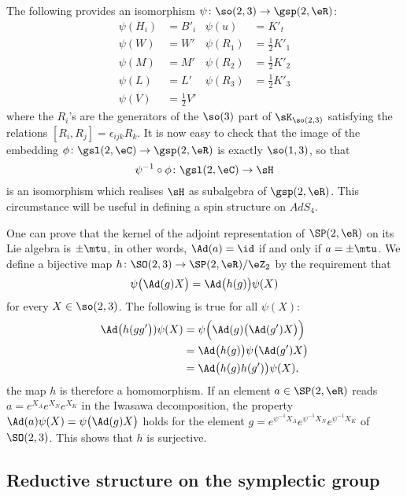 The following provides an isomorphism $\psi\colon \so(2,3)\to \gsp(2,\eR)$:
\begin{align*}
	\psi(H_i) & =B'_i            & \psi(u)   & =K'_t              \\
	\psi(W)   & =W'              & \psi(R_1) & =\frac{ 1 }{2}K'_1 \\
	\psi(M)   & =M'              & \psi(R_2) & =\frac{ 1 }{2}K'_2 \\
	\psi(L)   & =L'              & \psi(R_3) & =\frac{ 1 }{2}K'_3 \\
	\psi(V)   & =\frac{ 1 }{2}V'
\end{align*}
where the $R_i$'s are the generators of the $\so(3)$ part of $\sK_{\so(2,3)}$ satisfying the relations $[R_i,R_j]=\epsilon_{ijk}R_k$. It is now easy to check that the image of the embedding $\phi\colon \gsl(2,\eC) \to \gsp(2,\eR)$ is exactly $\so(1,3)$, so that
\begin{equation}
	\psi^{-1}\circ\phi\colon \gsl(2,\eC)\to \sH
\end{equation}
is an isomorphism which realises $\sH$ as subalgebra of $\gsp(2,\eR)$. This circumstance will be useful in defining a spin structure on $AdS_4$.

One can prove that the kernel of the adjoint representation of $\SP(2,\eR)$ on its Lie algebra is $\pm\mtu$, in other words, $\Ad(a)=\id$ if and only if $a=\pm\mtu$. We define a bijective map $h\colon \SO(2,3)\to \SP(2,\eR)/\eZ_2$ by the requirement that
\begin{equation}		\label{Eqdefhspsl}
	\psi\big( \Ad(g)X \big)=\Ad\big( h(g) \big)\psi(X)
\end{equation}
for every $X\in\so(2,3)$. The following is true for all $\psi(X)$:
\[
	\begin{split}
		\Ad\big(h(gg'\big)) \psi(X)&=\psi\Big( \Ad(g)\big( \Ad(g')X \big) \Big)\\
		&=\Ad\big( h(g) \big)\psi\big( \Ad(g')X \big)\\
		&=\Ad\big( h(g)h(g') \big)\psi(X),
	\end{split}
\]
the map $h$ is therefore a homomorphism. If an element $a\in \SP(2,\eR)$ reads $a= e^{X_A} e^{X_N} e^{X_K}$ in the Iwasawa decomposition, the property $\Ad(a)\psi(X)=\psi\big( \Ad(g)X \big)$ holds for the element\label{PgSolhpsiSP} $g= e^{\psi^{-1}X_A} e^{\psi^{-1}X_N} e^{\psi^{-1}X_K}$ of $\SO(2,3)$. This shows that $h$ is surjective.

\subsection{Reductive structure on the symplectic group}		\label{SubSecRedspT}


